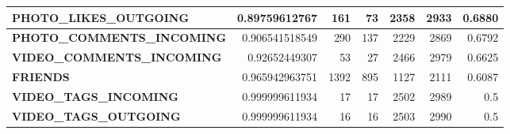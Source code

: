 \begin{table}
\begin{tabular}{| >{\small}l | >{\small}r | >{\small}r | >{\small}r | >{\small}r | >{\small}r | >{\small}r |}
	\hline
	\textbf{PHOTO\_LIKES\_OUTGOING} & 0.89759612767 & 161 & 73 & 2358 & 2933 & 0.6880\\
	\hline
	\textbf{PHOTO\_COMMENTS\_INCOMING} & 0.906541518549 & 290 & 137 & 2229 & 2869 & 0.6792\\
	\hline
	\textbf{VIDEO\_COMMENTS\_INCOMING} & 0.92652449307 & 53 & 27 & 2466 & 2979 & 0.6625\\
	\hline
	\textbf{FRIENDS} & 0.965942963751 & 1392 & 895 & 1127 & 2111 & 0.6087\\
	\hline
	\textbf{VIDEO\_TAGS\_INCOMING} & 0.999999611934 & 17 & 17 & 2502 & 2989 & 0.5\\
	\hline
	\textbf{VIDEO\_TAGS\_OUTGOING} & 0.999999611934 & 16 & 16 & 2503 & 2990 & 0.5\\
	\hline
	\end{tabular}
\end{table}

\cleardoublepage

